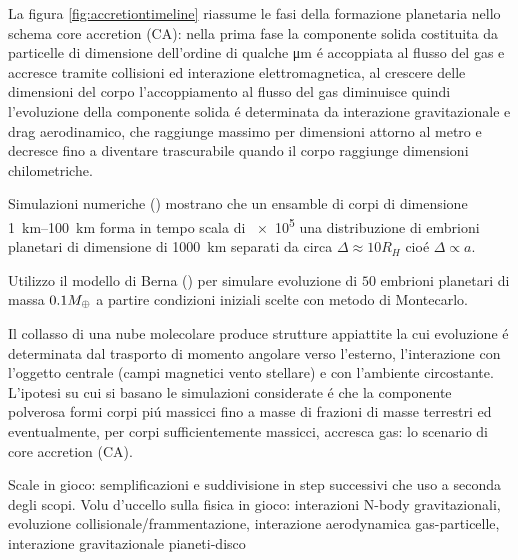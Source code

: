 \documentclass[twoside,11pt,fleqn]{memoir}%
\begin{document}
La figura \ref{fig:accretiontimeline} riassume le fasi della formazione planetaria nello schema core accretion (CA): nella prima fase la componente solida costituita da particelle di dimensione dell'ordine di qualche \si{\micro\meter} \'e accoppiata al flusso del gas e accresce tramite collisioni ed interazione elettromagnetica, al crescere delle dimensioni del corpo l'accoppiamento al flusso del gas diminuisce quindi l'evoluzione della componente solida \'e determinata da interazione gravitazionale e drag aerodinamico, che raggiunge massimo per dimensioni attorno al metro e decresce fino a diventare trascurabile quando il corpo raggiunge dimensioni chilometriche.
\begin{workout}
 Simulazioni numeriche (\cite{kokubo2012dynamics}) mostrano che un ensamble di corpi di dimensione \SIrange{1}{100}{\kilo\meter} forma in tempo scala di \SI{e5}{\year} una distribuzione di embrioni planetari di dimensione di \SI{1000}{\kilo\meter} separati da circa $\Delta\approx10R_H$ cio\'e $\Delta\propto a$.
\end{workout}
\begin{workout}
Utilizzo il modello di Berna (\cite{bibid}) per simulare evoluzione di $50$ embrioni planetari di massa $0.1M_{\oplus}{}$ a partire condizioni iniziali scelte con metodo di Montecarlo.
\end{workout}

\begin{errata}
Il collasso di una nube molecolare produce strutture appiattite la cui evoluzione \'e determinata dal trasporto di momento angolare verso l'esterno, l'interazione con l'oggetto centrale (campi magnetici vento stellare) e con l'ambiente circostante.
L'ipotesi su cui si basano le simulazioni considerate \'e che la componente polverosa formi corpi pi\'u massicci fino a masse di frazioni di masse terrestri  ed eventualmente, per corpi sufficientemente massicci, accresca gas: lo scenario di core accretion (CA).
\end{errata}

\begin{workout}
Scale in gioco: semplificazioni e suddivisione in step successivi che uso a seconda degli scopi.
Volu d'uccello sulla fisica in gioco: interazioni N-body gravitazionali, evoluzione collisionale/frammentazione, interazione aerodynamica gas-particelle, interazione gravitazionale pianeti-disco
\end{workout}
\end{document}
